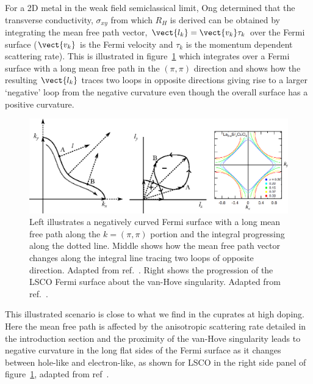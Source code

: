 For a 2D metal in the weak field semiclassical limit, Ong determined that the transverse conductivity, $\sigma_{xy}$ from which $R_H$ is derived can be obtained by integrating the mean free path vector, $\vect{l_k} = \vect{v_k}\tau_k$ over the Fermi surface ($\vect{v_k}$ is the Fermi velocity and $\tau_k$ is the momentum dependent scattering rate). This is illustrated in figure~\ref{Fig:Theo:NegativeCurvatureLSCO} which integrates over a Fermi surface with a long mean free path in the $(\pi, \pi)$ direction and shows how the resulting $\vect{l_k}$ traces two loops in opposite directions giving rise to a larger `negative' loop from the negative curvature even though the overall surface has a positive curvature.
\begin{figure}[htbp]
    \begin{center}
        \includegraphics[scale=0.8]{Chapter-Theory/Figures/NegativeCurvatureLSCO/NegativeCurvatureLSCO}
        \caption{Left illustrates a negatively curved Fermi surface with a long mean free path along the $k = (\pi, \pi)$ portion and the integral progressing along the dotted line. Middle shows how the mean free path vector changes along the integral line tracing two loops of opposite direction. Adapted from ref.~\cite{Narduzzo2008}. Right shows the progression of the \ac{LSCO} Fermi surface about the van-Hove singularity. Adapted from ref.~\cite{Hashimoto2008}.}
        \label{Fig:Theo:NegativeCurvatureLSCO}
    \end{center}
\end{figure}
This illustrated scenario is close to what we find in the cuprates at high doping. Here the mean free path is affected by the anisotropic scattering rate detailed in the introduction section and the proximity of the van-Hove singularity leads to negative curvature in the long flat sides of the Fermi surface as it changes between hole-like and electron-like, as shown for \ac{LSCO} in the right side panel of figure~\ref{Fig:Theo:NegativeCurvatureLSCO}, adapted from ref~\cite{Hashimoto2008}.
